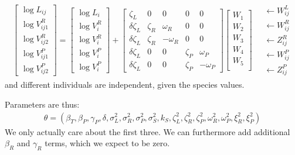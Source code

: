 \documentclass{article}
\begin{document}
\begin{align}
\begin{bmatrix}
    \log L_{ij} \\
    \log V_{ij1}^R \\ \log V_{ij2}^R  \\
    \log V_{ij1}^P \\ \log V_{ij2}^P  
\end{bmatrix}
=
\begin{bmatrix}
    \log L_{i} \\
    \log V_{i}^R \\ \log V_{i}^R  \\
    \log V_{i}^P \\ \log V_{i}^P  
\end{bmatrix}
+
\begin{bmatrix}
    \zeta_L  &   0 & 0  & 0  & 0 \\
    \delta \zeta_L  &  \zeta_R  &  \omega_R  & 0 & 0 \\ 
    \delta \zeta_L  & \zeta_R   & - \omega_R & 0 & 0\\ 
    \delta \zeta_L  & 0 & 0 &  \zeta_P  & \omega_P  \\ 
    \delta \zeta_L  & 0 & 0 &  \zeta_P  & - \omega_P
\end{bmatrix}
\begin{bmatrix}
W_1 \\W_2 \\W_3 \\W_4 \\ W_5  \\ 
\end{bmatrix}
\quad \begin{matrix}
    \leftarrow W^L_{ij}  \\
    \leftarrow W^R_{ij}  \\
    \leftarrow Z^R_{ij}  \\
    \leftarrow W^P_{ij} \\ 
    \leftarrow Z^P_{ij} 
\end{matrix}
\end{align}
and different individuals are independent, given the species values.

Parameters are thus: 
\begin{align}
    \theta = (
    \beta_T,
    \beta_P,
    \gamma_P,
    \delta,
    \sigma^2_L, 
    \sigma^2_R, 
    \sigma^2_P, 
    \sigma^2_S,
    k_S,
    \zeta^2_L,
    \zeta^2_R,
    \zeta^2_P,
    \omega^2_R,
    \omega^2_P,
    \xi^2_R,
    \xi^2_P
    )
\end{align}
We only actually care about the first three.
We can furthermore add additional $\beta_R$ and $\gamma_R$ terms, which we expect to be zero.
\end{document}
